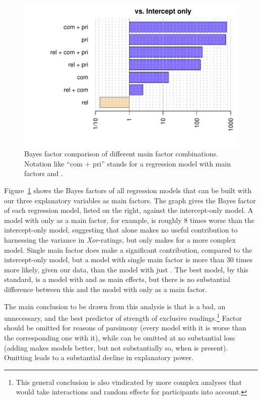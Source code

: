 \documentclass[12pt]{article}
\begin{document}
\begin{figure}
  \centering
  \includegraphics[width = 0.8 \textwidth]{pics/bfsAllExp1.pdf}
  \caption{Bayes factor comparison of different main factor combinations. Notation like ``com +
    pri'' stands for a regression model with main factors \com and \pri.}
  \label{fig:BFs}
\end{figure}


Figure~\ref{fig:BFs} shows the Bayes factors of all regression models that can be built with
our three explanatory variables as main factors. The graph gives the Bayes factor of each
regression model, listed on the right, against the intercept-only model. A model with only \rel
as a main factor, for example, is roughly 8 times worse than the intercept-only model,
suggesting that \rel alone makes no useful contribution to harnessing the variance in
\emph{Xor}-ratings, but only makes for a more complex model. Single main factor \com does make
a significant contribution, compared to the intercept-only model, but a model with single main
factor \pri is more than 30 times more likely, given our data, than the model with just
\com. The best model, by this standard, is a model with \com and \pri as main effects, but
there is no substantial difference between this and the model with only \pri as a main factor.

The main conclusion to be drawn from this analysis is that \rel is a bad, \com an unnecessary,
and \pri the best predictor of strength of exclusive readings.\footnote{This general conclusion
  is also vindicated by more complex analyses that would take interactions and random effects
  for participants into account.} Factor \rel should be omitted for reasons of parsimony (every
model with it is worse than the corresponding one with it), while \com can be omitted at no
substantial loss (adding \com makes models better, but not substantially so, when \pri is
present). Omitting \pri leads to a substantial decline in explanatory power.
\end{document}
